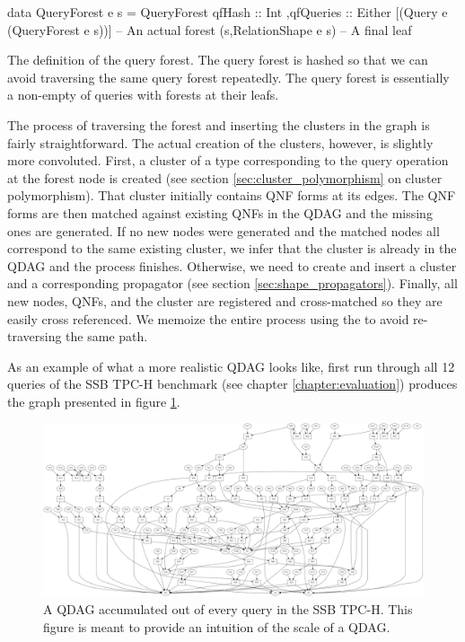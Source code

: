 \begin{code}
  \begin{haskellcode}
    data QueryForest e s =
      QueryForest
      { qfHash :: Int
        ,qfQueries
          :: Either
            [(Query e (QueryForest e s))] -- An actual forest
            (s,RelationShape e s) -- A final leaf
      }
  \end{haskellcode}

  \caption{\label{lst:query_forest}The definition of the query forest. The
    query forest is hashed so that we can avoid traversing the same
    query forest repeatedly. The query forest is essentially a
    non-empty of queries with forests at their leafs.}
\end{code}

The process of traversing the forest and inserting the clusters in the
graph is fairly straightforward. The actual creation of the clusters,
however, is slightly more convoluted. First, a cluster of a type
corresponding to the query operation at the forest node is created
(see section \ref{sec:cluster_polymorphism} on cluster
polymorphism). That cluster initially contains QNF forms at its
edges. The QNF forms are then matched against existing QNFs in the
QDAG and the missing ones are generated. If no new nodes were
generated and the matched nodes all correspond to the same existing
cluster, we infer that the cluster is already in the QDAG and the
process finishes. Otherwise, we need to create and insert a cluster
and a corresponding propagator (see section
\ref{sec:shape_propagators}). Finally, all new nodes, QNFs, and the
cluster are registered and cross-matched so they are easily cross
referenced.  We memoize the entire process using the  to
avoid re-traversing the same path.

As an example of what a more realistic QDAG looks like, first run
through all 12 queries of the SSB TPC-H benchmark (see chapter
\ref{chapter:evaluation}) produces the graph presented in figure
\ref{fig:ssb_graph}.

\begin{figure}[H]
  \centering
  \includegraphics[width=\textwidth]{./imgs/ssb_graph.pdf}
  \caption{\label{fig:ssb_graph}A QDAG accumulated out of every query
    in the SSB TPC-H. This figure is meant to provide an intuition of
    the scale of a QDAG.}
\end{figure}

